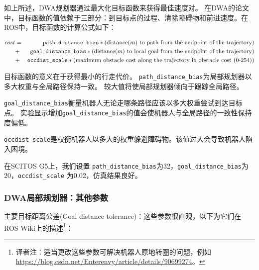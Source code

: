 如上所述，DWA规划器通过最大化目标函数来获得最佳速度对。
在DWA的论文中，目标函数的值依赖于三部分：到目标点的过程、清除障碍物和前进速度。在ROS中，目标函数的计算公式如下：

\begin{eqnarray*}\footnotesize
	cost &=& \texttt{path\_distance\_bias} * (\text{distance($m$) to path from the endpoint of the trajectory})\\
	&+& \texttt{goal\_distance\_bias} * (\text{distance($m$) to local goal from the endpoint of the trajectory})\\
	&+& \texttt{occdist\_scale} * (\text{maximum obstacle cost along the trajectory in obstacle cost (0-254)})
\end{eqnarray*}

目标函数的意义在于获得最小的行走代价。
\texttt{path_distance_bias}为局部规划器以多大权重与全局路径保持一致\cite{furrer2016robot}。
较大值将使局部规划器倾向于跟踪全局路径。

\texttt{goal_distance_bias}衡量机器人无论走哪条路径应该以多大权重尝试到达目标点。
实验显示增加\texttt{goal_distance_bias}的值会使机器人与全局路径的一致性保持度偏低。

\texttt{occdist_scale}是权衡机器人以多大的权重躲避障碍物。该值过大会导致机器人陷入困境。

在SCITOS G5上，我们设置 \texttt{path_distance_bias}为32，\texttt{goal_distance_bias}为20，\texttt{occdist_scale} 为0.02，仿真结果良好。

\subsubsection[DWA Local Planner: Other Parameters]{DWA局部规划器：其他参数}%

主要目标距离公差(Goal distance tolerance)：这些参数很直观，以下为它们在ROS Wiki上的描述\footnote{译者注：适当更改这些参数可解决机器人原地转圈的问题，例如\url{https://blog.csdn.net/Enterenvy/article/details/90699274}。}：

